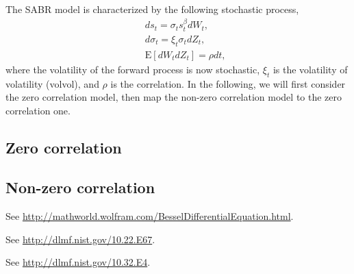 \documentclass[12pt]{article}
\begin{document}
  The SABR model is characterized by the following stochastic process,
  \begin{eqnarray}
    && ds_t=\sigma_t s_t^{\beta}dW_t,\nonumber\\
    && d\sigma_t=\xi_t\sigma_tdZ_t,\\
    && {\mathrm E}[dW_tdZ_t]=\rho dt,\nonumber
  \end{eqnarray}
  where the volatility of the forward process is now stochastic, $\xi_t$ is the volatility of volatility (volvol),
  and $\rho$ is the correlation. In the following, we will first consider the zero correlation model, then map the non-zero
  correlation model to the zero correlation one.

  \subsection{Zero correlation}



  \subsection{Non-zero correlation}










\begin{thebibliography}{99}
    See \url{http://mathworld.wolfram.com/BesselDifferentialEquation.html}.

    See \url{http://dlmf.nist.gov/10.22.E67}.

    See \url{http://dlmf.nist.gov/10.32.E4}.
\end{thebibliography}
\end{document}
